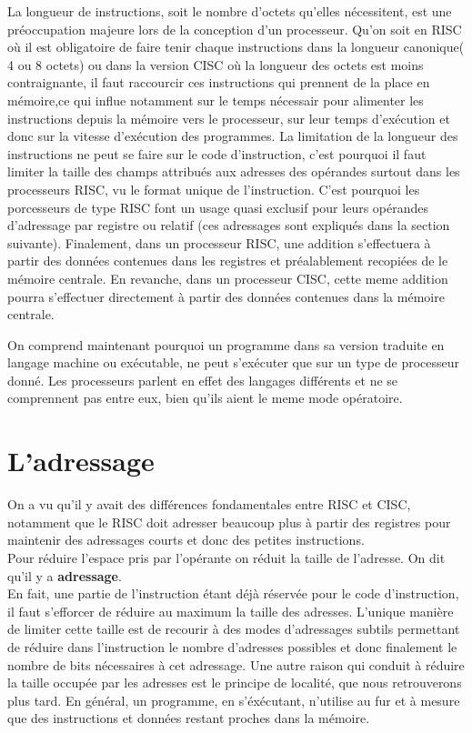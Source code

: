 \documentclass{report}
\begin{document}
La longueur de instructions, soit le nombre d'octets qu'elles nécessitent, est une préoccupation majeure lors de la conception d'un processeur. Qu'on soit en RISC où il est obligatoire de faire tenir chaque instructions dans la longueur canonique( 4 ou 8 octets) ou dans la version CISC où la longueur des octets est moins contraignante, il faut raccourcir ces instructions qui prennent de la place en mémoire,ce qui influe notamment sur le temps nécessair pour alimenter les instructions depuis la mémoire vers le processeur, sur leur temps d'exécution et donc sur la vitesse d'exécution des programmes. La limitation de la longueur des instructions ne peut se faire sur le code d'instruction, c'est pourquoi il faut limiter la taille des champs attribués aux adresses des opérandes surtout dans les processeurs RISC, vu le format unique de l'instruction. C'est pourquoi les porcesseurs de type RISC font un usage quasi exclusif pour leurs opérandes d'adressage par registre ou relatif (ces adressages sont expliqués dans la section suivante). Finalement, dans un processeur RISC, une addition s'effectuera à partir des données contenues dans les registres et préalablement recopiées de le mémoire centrale. En revanche, dans un processeur CISC, cette meme addition pourra s'effectuer directement à partir des données contenues dans la mémoire centrale.

On comprend maintenant pourquoi un programme dans sa version traduite en langage machine ou exécutable, ne peut s'exécuter que sur un type de processeur donné. Les processeurs parlent en effet des langages différents et ne se comprennent pas entre eux, bien qu'ils aient le meme mode opératoire.

\section{L'adressage}

On a vu qu'il y avait des différences fondamentales entre RISC et CISC, notamment que le RISC doit adresser beaucoup plus à partir des registres pour maintenir des adressages courts et donc des petites instructions.\\


Pour réduire l'espace pris par l'opérante on réduit la taille de l'adresse. On dit qu'il y a {\bf adressage}.\\ En fait, une partie de l'instruction étant déjà réservée pour le code d'instruction, il faut s'efforcer de réduire au maximum la taille des adresses. L'unique manière de limiter cette taille est de recourir à des modes d'adressages subtils permettant de réduire dans l'instruction le nombre d'adresses possibles et donc finalement le nombre de bits nécessaires à cet adressage. Une autre raison qui conduit à réduire la taille occupée par les adresses est le principe de localité, que nous retrouverons plus tard. En général, un programme, en s'éxécutant, n'utilise au fur et à mesure que des instructions et données restant proches dans la mémoire.
\end{document}
